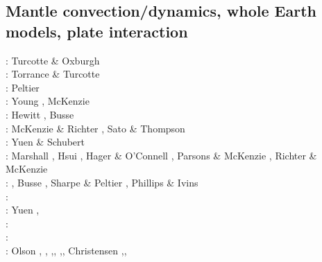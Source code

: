 \subsection{Mantle convection/dynamics, whole Earth models, plate interaction}

\begin{scriptsize}
\nineteensixtyseven: Turcotte \& Oxburgh \cite{tuox67}\\
\nineteenseventyone: Torrance \& Turcotte \cite{totu71}\\
\nineteenseventytwo: Peltier \cite{pelt72}\\
\nineteenseventyfour: Young \cite{youn74}, McKenzie \etal \cite{mcrw74}\\
\nineteenseventyfive: Hewitt \etal \cite{hemw75}, Busse \cite{buss75}\\
\nineteenseventysix: McKenzie \& Richter \cite{mcri76}, Sato \& Thompson \cite{sath76}\\
\nineteenseventyseven: Yuen \& Schubert \cite{yusc77} \\
\nineteenseventyeight: Marshall \etal \cite{mahz78}, Hsui \cite{hsui78}, Hager \& O'Connell \cite{haoc78},
                       Parsons \& McKenzie \cite{pamc78}, Richter \& McKenzie \cite{rimc78}\\
\nineteenseventynine: \cite{ludt79}, Busse \cite{buss79}, Sharpe \& Peltier \cite{shpe79},
                      Phillips \& Ivins \cite{phiv79}\\
\nineteeneighty: \cite{olco80}\cite{jamc80}\cite{scsc80}\cite{zess80}\\
\nineteeneightyone: Yuen \etal \cite{yups81}, \cite{buss81}\cite{jasc81}\cite{haoc81}\cite{cotu81}\\
\nineteeneightytwo: \cite{jape82}\cite{homc82}\cite{buri82}\\
\nineteeneightythree: \cite{hous83}\cite{hous83b}
                      \cite{chri83}\cite{mcke83}
                      \cite{chri83b}\cite{zesd83}\\
\nineteeneightyfour: Olson \etal \cite{olyb84}, \cite{jarv84},
                     \cite{haeb84},\cite{harp84},
                     \cite{davi84},\cite{boas84},
                     Christensen \cite{chri84,chri84b},\cite{moca84},

\end{scriptsize}
